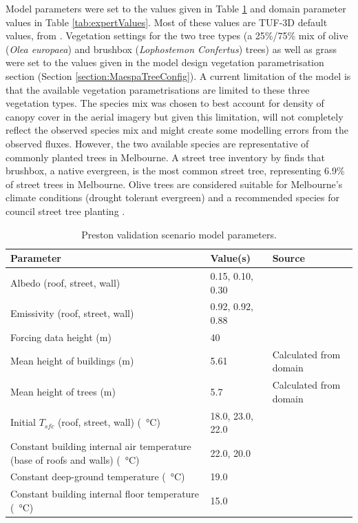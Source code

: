 \documentclass[final,3p,times,authoryear]{elsarticle}
\begin{document}
Model parameters were set to the values given in Table \ref{tab:modprvalpara} and domain parameter values in Table \ref{tab:expertValues}. Most of these values are TUF-3D default values, from \cite{Krayenhoff2007}. Vegetation settings for the two tree types (a 25\%/75\% mix of olive (\textit{Olea europaea}) and brushbox (\textit{Lophostemon Confertus}) trees) as well as grass were set to the values given in the model design vegetation parametrisation section (Section \ref{section:MaespaTreeConfig}). A current limitation of the model is that the available vegetation parametrisations are limited to these three vegetation types. The species mix was chosen to best account for density of canopy cover in the aerial imagery but given this limitation, will not completely reflect the observed species mix and might create some modelling errors from the observed fluxes. However, the two available species are representative of commonly planted trees in Melbourne. A street tree inventory by \cite{Frank2006} finds that brushbox, a native evergreen, is the most common street tree, representing 6.9\% of street trees in Melbourne. Olive trees are considered suitable for Melbourne's climate conditions (drought tolerant evergreen) and a recommended species for council street tree planting \citep{PortPhillip2010}.


\begin{table}[!htbp]
\caption{Preston validation scenario model parameters. \label{tab:modprvalpara}}     
\begin{tabular}{| p{8.0cm} | l | l|}
\hline
\textbf{Parameter} & \textbf{Value(s)} & \textbf{Source}\\ \hline
Albedo (roof, street, wall)   & 0.15, 0.10, 0.30   & \cite{Krayenhoff2007}\\ \hline
Emissivity (roof, street, wall)   & 0.92, 0.92, 0.88   & \cite{Krayenhoff2007}\\ \hline
Forcing data height (m)  & 40   & \cite{Coutts2007} \\ \hline
Mean height of buildings (m)  & 5.61   & Calculated from domain \\ \hline
Mean height of trees (m)  & 5.7   & Calculated from domain \\ \hline
Initial $T_{sfc}$ (roof, street, wall) (\SI{}{\degreeCelsius})  & 18.0, 23.0, 22.0  & \cite{Krayenhoff2007}  \\ \hline
Constant building internal air temperature (base of roofs and walls) (\SI{}{\degreeCelsius})  & 22.0, 20.0 & \cite{Krayenhoff2007}   \\ \hline
Constant deep-ground temperature (\SI{}{\degreeCelsius})  & 19.0  & \cite{Krayenhoff2007} \\ \hline
Constant building internal floor temperature (\SI{}{\degreeCelsius})  & 15.0  & \cite{Krayenhoff2007} \\ \hline
\end{tabular}
\end{table}
\end{document}
